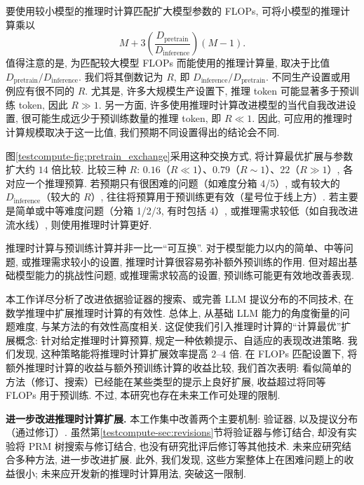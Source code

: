 要使用较小模型的推理时计算匹配扩大模型参数的 FLOPs, 可将小模型的推理计算乘以
\[
M+3\left(\frac{D_{\text{pretrain}}}{D_{\text{inference}}}\right)(M-1).
\]
值得注意的是, 为匹配较大模型 FLOPs 而能使用的推理计算量, 取决于比值 $D_{\text{pretrain}}/D_{\text{inference}}$. 我们将其倒数记为 $R$, 即 $D_{\text{inference}}/D_{\text{pretrain}}$. 不同生产设置或用例应有很不同的 $R$. 尤其是, 许多大规模生产设置下, 推理 token 可能显著多于预训练 token, 因此 $R\gg1$. 另一方面, 许多使用推理时计算改进模型的当代自我改进设置, 很可能生成远少于预训练数量的推理 token, 即 $R\ll1$. 因此, 可应用的推理时计算规模取决于这一比值, 我们预期不同设置得出的结论会不同. 

图\ref{testcompute-fig:pretrain_exchange}采用这种交换方式, 将计算最优扩展与参数扩大约 $14$ 倍比较. 比较三种 $R$: $0.16$（$R\ll1$）、$0.79$（$R\sim1$）、$22$（$R\gg1$）, 各对应一个推理预算. 若预期只有很困难的问题（如难度分箱 4/5）, 或有较大的 $D_{\text{inference}}$（较大的 $R$）, 往往将预算用于预训练更有效（星号位于线上方）. 若主要是简单或中等难度问题（分箱 1/2/3, 有时包括 4）, 或推理需求较低（如自我改进流水线）, 则使用推理时计算更好. 

\begin{remark}[交换预训练与推理时计算的要点]
推理时计算与预训练计算并非一比一“可互换”. 对于模型能力以内的简单、中等问题, 或推理需求较小的设置, 推理时计算很容易弥补额外预训练的作用. 但对超出基础模型能力的挑战性问题, 或推理需求较高的设置, 预训练可能更有效地改善表现. 
\end{remark}

本工作详尽分析了改进依据验证器的搜索、或完善 LLM 提议分布的不同技术, 在数学推理中扩展推理时计算的有效性. 总体上, 从基础 LLM 能力的角度衡量的问题难度, 与某方法的有效性高度相关. 这促使我们引入推理时计算的“计算最优”扩展概念: 针对给定推理时计算预算, 规定一种依赖提示、自适应的表现改进策略. 我们发现, 这种策略能将推理时计算扩展效率提高 $2$--$4$ 倍. 在 FLOPs 匹配设置下, 将额外推理时计算的收益与额外预训练计算的收益比较, 我们首次表明: 看似简单的方法（修订、搜索）已经能在某些类型的提示上良好扩展, 收益超过将同等 FLOPs 用于预训练. 不过, 本研究也存在未来工作可处理的限制. 

\textbf{进一步改进推理时计算扩展. }本工作集中改善两个主要机制: 验证器, 以及提议分布（通过修订）. 虽然第\ref{testcompute-sec:revisions}节将验证器与修订结合, 却没有实验将 PRM 树搜索与修订结合, 也没有研究批评后修订等其他技术\cite{testcompute-madaan2023selfrefine}. 未来应研究结合多种方法, 进一步改进扩展. 此外, 我们发现, 这些方案整体上在困难问题上的收益很小; 未来应开发新的推理时计算用法, 突破这一限制. 

